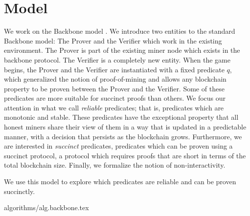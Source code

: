 \section{Model}

We work on the Backbone model \cite{backbone}. We introduce two entities to
the standard Backbone model: The Prover and the Verifier which work in the
existing environment. The Prover is part of the existing miner node which
exists in the backbone protocol. The Verifier is a completely new entity. When
the game begins, the Prover and the Verifier are instantiated with a fixed
predicate $q$, which generalized the notion of proof-of-mining and allows any
blockchain property to be proven between the Prover and the Verifier. Some of
these predicates are more suitable for succinct proofs than others. We focus
our attention in what we call \textit{ reliable} predicates; that is,
predicates which are monotonic and stable.  These predicates have the
exceptional property that all honest miners share their view of them in a way
that is updated in a predictable manner, with a decision that persists as the
blockchain grows.  Furthermore, we are interested in \textit{succinct}
predicates, predicates which can be proven using a succinct protocol, a
protocol which requires proofs that are short in terms of the total blockchain
size. Finally, we formalize the notion of non-interactivity.

We use this model to explore which predicates are reliable and can be proven
succinctly.

{algorithms/alg.backbone.tex}
